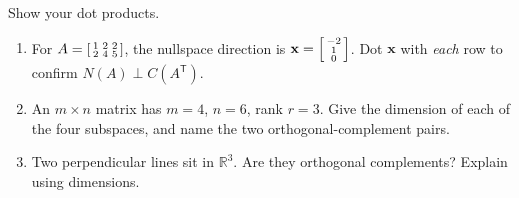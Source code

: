 \documentclass[10pt]{article}
\newcommand{\xx}{\mathbf{x}}
\newcommand{\T}{\mathsf{T}}
\begin{document}
\begin{practicebox}
Show your dot products.
\begin{enumerate}[leftmargin=1.6em, itemsep=4pt]
  \item For $A=\begin{bsmallmatrix} 1 & 2 & 2\\ 2 & 4 & 5 \end{bsmallmatrix}$, the nullspace direction is
        $\xx=\begin{bsmallmatrix} -2\\1\\0 \end{bsmallmatrix}$. Dot $\xx$ with \emph{each} row to confirm
        $N(A)\perp C(A^{\T})$. \writeline
  \item An $m\times n$ matrix has $m=4$, $n=6$, rank $r=3$. Give the dimension of each of the four
        subspaces, and name the two orthogonal-complement pairs. \writeline
  \item Two perpendicular lines sit in $\mathbb{R}^3$. Are they orthogonal complements? Explain using
        dimensions. \writeline
\end{enumerate}
\end{practicebox}
\end{document}
